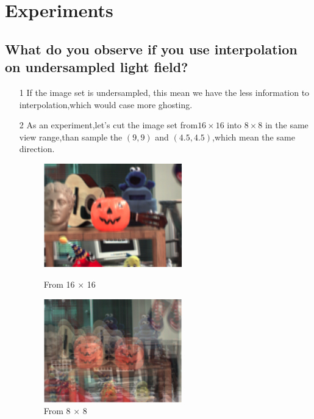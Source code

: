 \documentclass[letterpaper,12pt]{article}
\begin{document}
\section{Experiments}
\subsection{What do you observe if you use interpolation on undersampled light field?}
\begin{itemize}
\item[1]If the image set is undersampled, this mean we have the less information to interpolation,which would case more ghosting. 
\item[2]As an experiment,let's cut the image set from$16 \times 16$ into $8 \times 8$ in the same view range,than sample the $(9,9)$ and $(4.5,4.5)$,which mean the same direction.
\begin{figure}[htbp]
	\centering
	\begin{minipage}[t]{0.48\textwidth}
		\centering
		\includegraphics[width=6cm]{Image/0.75.png}
		\caption{From 16 $\times$ 16}
	\end{minipage}
	\begin{minipage}[t]{0.48\textwidth}
		\centering
		\includegraphics[width=6cm]{Image/64.png}
		\caption{From 8 $\times$ 8}
	\end{minipage}
\end{figure}
\end{itemize}
\end{document}
